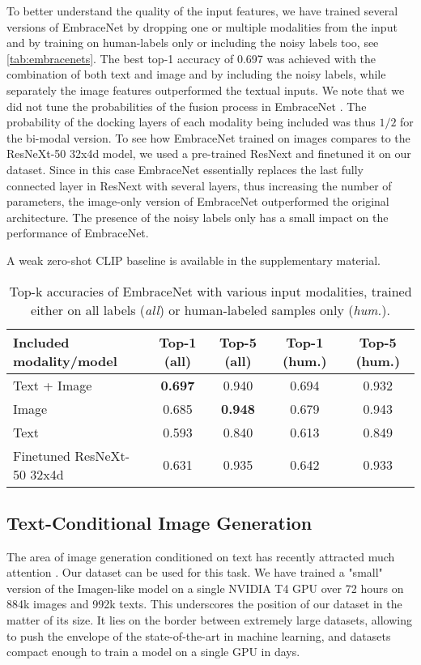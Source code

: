 \documentclass{bmvc2k}
\begin{document}
To better understand the quality of the input features, we have trained several versions of EmbraceNet by dropping one or multiple modalities from the input and by training on human-labels only or including the noisy labels too, see \autoref{tab:embracenets}. The best top-1 accuracy of 0.697 was achieved with the combination of both text and image and by including the noisy labels, while separately the image features outperformed the textual inputs. We note that we did not tune the probabilities of the fusion process in EmbraceNet \cite{embracenet}. The probability of the docking layers of each modality being included was thus $1/2$ for the bi-modal version. To see how EmbraceNet trained on images compares to the ResNeXt-50 32x4d model, we used a pre-trained ResNext and finetuned it on our dataset. Since in this case EmbraceNet essentially replaces the last fully connected layer in ResNext with several layers, thus increasing the number of parameters, the image-only version of EmbraceNet outperformed the original architecture. The presence of the noisy labels only has a small impact on the performance of EmbraceNet.

 A weak zero-shot CLIP baseline is available in the supplementary material.

\begin{table}
\centering
\caption{Top-k accuracies of EmbraceNet with various input modalities, trained either on all labels (\textit{all}) or human-labeled samples only (\textit{hum.}).}
\vspace{1mm}
\renewcommand{\arraystretch}{1.1}
\label{tab:embracenets}
\begin{tabular}{lcccc}
\hline
Included modality/model & Top-1 (all) &   Top-5 (all)  & Top-1 (hum.) &   Top-5 (hum.) \\
\hline
Text + Image & \textbf{0.697} & 0.940 & 0.694 & 0.932  \\
Image & 0.685 & \textbf{ 0.948} & 0.679 & 0.943  \\
Text &  0.593 & 0.840 &  0.613 & 0.849  \\
Finetuned ResNeXt-50 32x4d & 0.631 &  0.935 & 0.642 & 0.933 \\
\hline
\end{tabular}
\end{table}

\subsection{Text-Conditional Image Generation}
\label{sec:experiments_imagen}
The area of image generation conditioned on text has recently attracted much attention \cite{imagen,dall-e-2,rombach2022high}. Our dataset can be used for this task. We have trained a "small" version of the Imagen-like model \cite{imagen} on a single NVIDIA T4 GPU over 72 hours on 884k images and 992k texts. This underscores the position of our dataset in the matter of its size. It lies on the border between extremely large datasets, allowing to push the envelope of the state-of-the-art in machine learning,  and datasets compact enough to train a model on a single GPU in days. 
\end{document}
